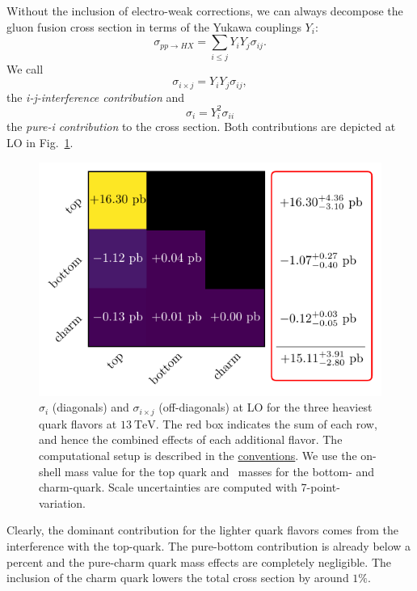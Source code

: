 Without the inclusion of electro-weak corrections, we can always decompose the gluon fusion cross section in terms of the Yukawa couplings $Y_i$:
\begin{equation}
\sigma_{pp \rightarrow HX} =  \sum_{i\le j} Y_i Y_j \sigma_{i j}.
\end{equation}
We call
\begin{equation}
\sigma_{i \times j} = Y_i Y_j \sigma_{ij},
\end{equation}
the \textit{i-j-interference contribution} and
\begin{equation}
\sigma_{i} = Y_i^2 \sigma_{ii}
\end{equation}
the \textit{pure-i contribution} to the cross section. Both contributions are depicted at \acs{LO} in Fig.~\ref{fig:4:quark_effects}.
\begin{figure}[h]
\centering
\includegraphics[scale=0.9]{Images/quark_effects_LO.pdf}
\caption{$\sigma_{i}$ (diagonals) and $\sigma_{i \times j}$ (off-diagonals) at \acs{LO} for the three heaviest quark flavors at $13\ \mathrm{TeV}$. The red box indicates the sum of each row, and hence the combined effects of each additional flavor. The computational setup is described in the \hyperref[chap:notation_and_conventions]{conventions}. We use the on-shell mass value for the top quark and \MS\ masses for the bottom- and charm-quark. Scale uncertainties are computed with 7-point-variation.}
\label{fig:4:quark_effects}
\end{figure}
Clearly, the dominant contribution for the lighter quark flavors comes from the interference with the top-quark. The pure-bottom contribution is already below a percent and the pure-charm quark mass effects are completely negligible. The inclusion of the charm quark lowers the total cross section by around $1\%$.


